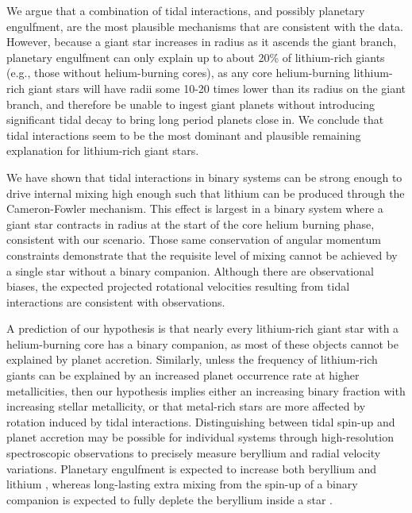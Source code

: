 \documentclass[twocolumn]{aastex62}
\begin{document}
We argue that a combination of tidal interactions, and possibly planetary engulfment, 
are the most plausible mechanisms that are consistent with the data. However,
because a giant star increases in radius as it ascends the giant branch, 
planetary engulfment can only explain up to about 20\% of lithium-rich giants 
(e.g., those without helium-burning cores), as any core helium-burning lithium-rich
giant stars will have radii some 10-20 times lower than its radius on the giant branch, and therefore be unable to ingest giant planets without introducing significant tidal decay to bring long period planets close in.
We conclude that tidal interactions seem to be the most dominant and plausible
remaining explanation for lithium-rich giant stars.


We have shown that tidal interactions in binary systems can be strong enough
to drive internal mixing high enough such that lithium can be produced through the 
Cameron-Fowler mechanism. This effect is largest in a binary system where a giant star 
contracts in radius at the start of the core helium burning phase, consistent with
our scenario.
Those same conservation of angular momentum constraints demonstrate that the
requisite level of mixing cannot be achieved by a single star without a binary
companion. Although
there are observational biases, the expected projected rotational velocities 
resulting from tidal interactions are consistent with observations.

A prediction of our hypothesis is that nearly every lithium-rich giant star
with a helium-burning core has a binary companion, as most of these objects cannot be
explained by planet accretion. 
Similarly, unless 
the frequency of lithium-rich giants can be explained by an increased planet 
occurrence rate at higher metallicities,
then our hypothesis implies either an increasing binary fraction with increasing stellar 
metallicity, or that metal-rich stars are more affected by rotation induced by
tidal interactions.
Distinguishing between tidal spin-up and planet accretion may be possible for 
individual systems through high-resolution spectroscopic observations
to precisely measure beryllium and radial velocity variations. Planetary 
engulfment is expected to increase both beryllium and lithium \citep{Siess_1999,
Melo_2005}, whereas long-lasting extra mixing from the spin-up of a binary 
companion is expected to fully deplete the beryllium inside a star \citep{Sackmann_1999}.\\

\acknowledgments
\end{document}

